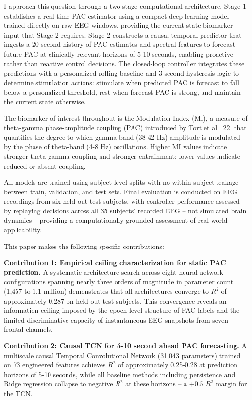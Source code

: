 \documentclass[11pt,letterpaper]{article}
\begin{document}
I approach this question through a two-stage computational architecture. Stage 1 establishes a real-time PAC estimator using a compact deep learning model trained directly on raw EEG windows, providing the current-state biomarker input that Stage 2 requires. Stage 2 constructs a causal temporal predictor that ingests a 20-second history of PAC estimates and spectral features to forecast future PAC at clinically relevant horizons of 5-10 seconds, enabling proactive rather than reactive control decisions. The closed-loop controller integrates these predictions with a personalized rolling baseline and 3-second hysteresis logic to determine stimulation actions: stimulate when predicted PAC is forecast to fall below a personalized threshold, rest when forecast PAC is strong, and maintain the current state otherwise.

The biomarker of interest throughout is the Modulation Index (MI), a measure of theta-gamma phase-amplitude coupling (PAC) introduced by Tort et al. [22] that quantifies the degree to which gamma-band (38-42 Hz) amplitude is modulated by the phase of theta-band (4-8 Hz) oscillations. Higher MI values indicate stronger theta-gamma coupling and stronger entrainment; lower values indicate reduced or absent coupling.

All models are trained using subject-level splits with no within-subject leakage between train, validation, and test sets. Final evaluation is conducted on EEG recordings from six held-out test subjects, with controller performance assessed by replaying decisions across all 35 subjects' recorded EEG -- not simulated brain dynamics -- providing a computationally grounded assessment of real-world applicability.

This paper makes the following specific contributions:

\textbf{Contribution 1: Empirical ceiling characterization for static PAC prediction.} A systematic architecture search across eight neural network configurations spanning nearly three orders of magnitude in parameter count (1,457 to 1.1 million) demonstrates that all architectures converge to $R^2$ of approximately 0.287 on held-out test subjects. This convergence reveals an information ceiling imposed by the epoch-level structure of PAC labels and the limited discriminative capacity of instantaneous EEG snapshots from seven frontal channels.

\textbf{Contribution 2: Causal TCN for 5-10 second ahead PAC forecasting.} A multiscale causal Temporal Convolutional Network (31,043 parameters) trained on 73 engineered features achieves $R^2$ of approximately 0.25-0.28 at prediction horizons of 5-10 seconds, while all baseline methods including persistence and Ridge regression collapse to negative $R^2$ at these horizons -- a +0.5 $R^2$ margin for the TCN.
\end{document}
